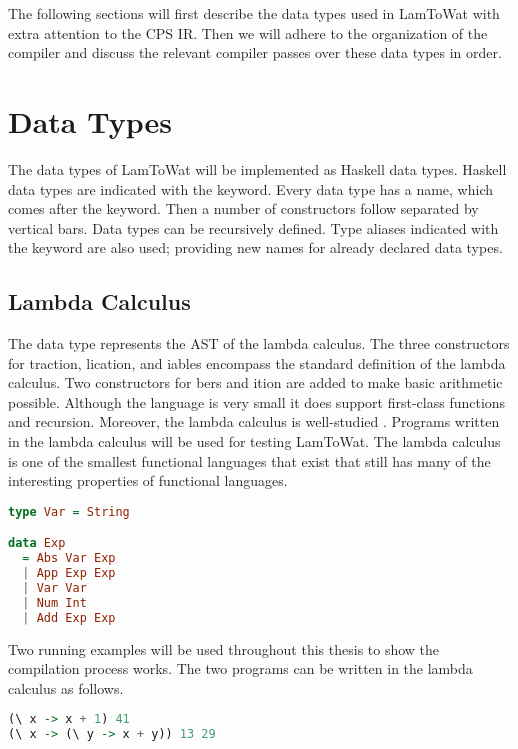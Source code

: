 The following sections will first describe the data types used in LamToWat with extra attention to the \ac{CPS} \ac{IR}. Then we will adhere to the organization of the compiler and discuss the relevant compiler passes over these data types in order.

\section{\label{section:datatypes}Data Types}
The data types of LamToWat will be implemented as Haskell data types. Haskell data types are indicated with the  keyword. Every data type has a name, which comes after the keyword. Then a number of constructors follow separated by vertical bars. Data types can be recursively defined. Type aliases indicated with the  keyword are also used; providing new names for already declared data types.

\subsection{\label{subsection:expdata}Lambda Calculus}
The  data type represents the \ac{AST} of the lambda calculus. The three constructors for traction, lication, and iables encompass the standard definition of the lambda calculus. Two constructors for bers and ition are added to make basic arithmetic possible. Although the language is very small it does support first-class functions and recursion. Moreover, the lambda calculus is well-studied \autocite{barendregt1984lambda}. Programs written in the lambda calculus will be used for testing LamToWat. The lambda calculus is one of the smallest functional languages that exist that still has many of the interesting properties of functional languages.

\begin{lstlisting}[language=Haskell]
type Var = String

data Exp
  = Abs Var Exp
  | App Exp Exp
  | Var Var
  | Num Int
  | Add Exp Exp
\end{lstlisting}

Two running examples will be used throughout this thesis to show the compilation process works. The two programs can be written in the lambda calculus as follows.

\begin{lstlisting}[language=Haskell]
(\ x -> x + 1) 41
(\ x -> (\ y -> x + y)) 13 29
\end{lstlisting}

